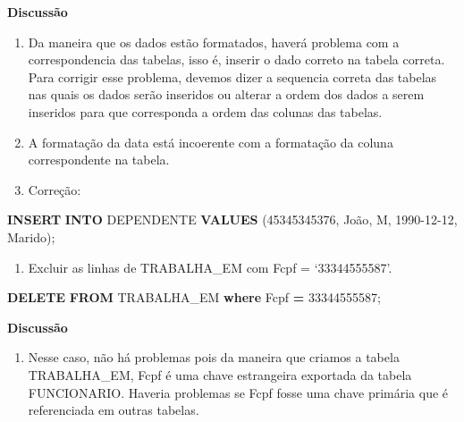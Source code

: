 \documentclass[
]{article}
\newenvironment{Shaded}{\begin{snugshade}}{\end{snugshade}}
\newcommand{\KeywordTok}[1]{\textcolor[rgb]{0.13,0.29,0.53}{\textbf{#1}}}
\newcommand{\NormalTok}[1]{#1}
\newcommand{\OperatorTok}[1]{\textcolor[rgb]{0.81,0.36,0.00}{\textbf{#1}}}
\newcommand{\StringTok}[1]{\textcolor[rgb]{0.31,0.60,0.02}{#1}}
\providecommand{\tightlist}{%
  \setlength{\itemsep}{0pt}\setlength{\parskip}{0pt}}
\begin{document}
\textbf{Discussão}

\begin{enumerate}
\def\labelenumi{\roman{enumi}.}
\item
  Da maneira que os dados estão formatados, haverá problema com a
  correspondencia das tabelas, isso é, inserir o dado correto na tabela
  correta. Para corrigir esse problema, devemos dizer a sequencia
  correta das tabelas nas quais os dados serão inseridos ou alterar a
  ordem dos dados a serem inseridos para que corresponda a ordem das
  colunas das tabelas.
\item
  A formatação da data está incoerente com a formatação da coluna
  correspondente na tabela.
\item
  Correção:
\end{enumerate}

\begin{Shaded}
\begin{Highlighting}[]
\KeywordTok{INSERT} \KeywordTok{INTO}\NormalTok{ DEPENDENTE }\KeywordTok{VALUES}\NormalTok{ (}\StringTok{\textquotesingle{}45345345376\textquotesingle{}}\NormalTok{, }\StringTok{\textquotesingle{}João\textquotesingle{}}\NormalTok{, }\StringTok{\textquotesingle{}M\textquotesingle{}}\NormalTok{, }\StringTok{\textquotesingle{}1990{-}12{-}12\textquotesingle{}}\NormalTok{, }\StringTok{\textquotesingle{}Marido\textquotesingle{}}\NormalTok{);}
\end{Highlighting}
\end{Shaded}

\begin{enumerate}
\def\labelenumi{\arabic{enumi}.}
\setcounter{enumi}{5}
\tightlist
\item
  Excluir as linhas de TRABALHA\_EM com Fcpf = `33344555587'.
\end{enumerate}

\begin{Shaded}
\begin{Highlighting}[]
\KeywordTok{DELETE} \KeywordTok{FROM}\NormalTok{ TRABALHA\_EM }\KeywordTok{where}\NormalTok{ Fcpf }\OperatorTok{=} \StringTok{\textquotesingle{}33344555587\textquotesingle{}}\NormalTok{;}
\end{Highlighting}
\end{Shaded}

\textbf{Discussão}

\begin{enumerate}
\def\labelenumi{\roman{enumi}.}
\tightlist
\item
  Nesse caso, não há problemas pois da maneira que criamos a tabela
  TRABALHA\_EM, Fcpf é uma chave estrangeira exportada da tabela
  FUNCIONARIO. Haveria problemas se Fcpf fosse uma chave primária que é
  referenciada em outras tabelas.
\end{enumerate}
\end{document}
